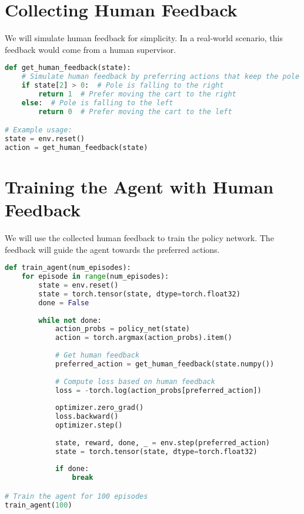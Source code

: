 \section{Collecting Human Feedback}
We will simulate human feedback for simplicity. In a real-world scenario, this feedback would come from a human supervisor.

\begin{lstlisting}[language=python]
def get_human_feedback(state):
    # Simulate human feedback by preferring actions that keep the pole balanced
    if state[2] > 0:  # Pole is falling to the right
        return 1  # Prefer moving the cart to the right
    else:  # Pole is falling to the left
        return 0  # Prefer moving the cart to the left

# Example usage:
state = env.reset()
action = get_human_feedback(state)
\end{lstlisting}

\section{Training the Agent with Human Feedback}
We will use the collected human feedback to train the policy network. The feedback will guide the agent towards the preferred actions.

\begin{lstlisting}[language=python]
def train_agent(num_episodes):
    for episode in range(num_episodes):
        state = env.reset()
        state = torch.tensor(state, dtype=torch.float32)
        done = False
        
        while not done:
            action_probs = policy_net(state)
            action = torch.argmax(action_probs).item()
            
            # Get human feedback
            preferred_action = get_human_feedback(state.numpy())
            
            # Compute loss based on human feedback
            loss = -torch.log(action_probs[preferred_action])
            
            optimizer.zero_grad()
            loss.backward()
            optimizer.step()
            
            state, reward, done, _ = env.step(preferred_action)
            state = torch.tensor(state, dtype=torch.float32)
            
            if done:
                break

# Train the agent for 100 episodes
train_agent(100)
\end{lstlisting}

